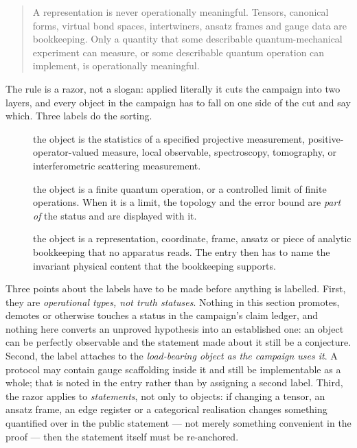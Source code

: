 \begin{quote}
A representation is never operationally meaningful. Tensors, canonical forms,
virtual bond spaces, intertwiners, ansatz frames and gauge data are
bookkeeping. Only a quantity that some describable quantum-mechanical
experiment can measure, or some describable quantum operation can implement,
is operationally meaningful.
\end{quote}

The rule is a razor, not a slogan: applied literally it cuts the campaign into
two layers, and every object in the campaign has to fall on one side of the
cut and say which. Three labels do the sorting.

\begin{description}
  \item[\opObs] the object is the statistics of a specified projective
    measurement, positive-operator-valued measure, local observable,
    spectroscopy, tomography, or interferometric scattering measurement.
  \item[\opImp] the object is a finite quantum operation, or a controlled
    limit of finite operations. When it is a limit, the topology and the error
    bound are \emph{part of} the status and are displayed with it.
  \item[\opGauge] the object is a representation, coordinate, frame, ansatz or
    piece of analytic bookkeeping that no apparatus reads. The entry then has
    to name the invariant physical content that the bookkeeping supports.
\end{description}

Three points about the labels have to be made before anything is labelled.
First, they are \emph{operational types, not truth statuses}. Nothing in this
section promotes, demotes or otherwise touches a status in the campaign's
claim ledger, and nothing here converts an unproved hypothesis into an
established one: an object can be perfectly observable and the statement made
about it still be a conjecture. Second, the label attaches to the
\emph{load-bearing object as the campaign uses it}. A protocol may contain
gauge scaffolding inside it and still be implementable as a whole; that is
noted in the entry rather than by assigning a second label. Third, the razor
applies to \emph{statements}, not only to objects: if changing a tensor, an
ansatz frame, an edge register or a categorical realisation changes something
quantified over in the public statement --- not merely something convenient in
the proof --- then the statement itself must be re-anchored.

